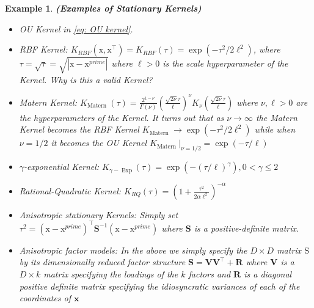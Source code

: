 \documentclass[11pt]{article}
\theoremstyle{plain} %
\newtheorem{example}[theorem]{Example}
\theoremstyle{remark}
\begin{document}
\begin{example} \textbf{(Examples of Stationary Kernels)}
  \begin{itemize}
    \item OU Kernel in \cref{eq: OU kernel}.

    \item RBF Kernel: $K_{R B F}\left(\mathrm{x}, \mathrm{x}^\top\right)=K_{R B
            F}(\tau)=\exp \left(-\tau^{2} / 2 \ell^{2}\right)$, where
          $\tau=\sqrt{\tau}=\sqrt{\left|\mathrm{x}-\mathrm{x}^{prime}\right|}$ where
          $\ell>0$ is the scale hyperparameter of the Kernel. Why is this a valid
          Kernel?

    \item Matern Kernel: $K_{\text {Matern
                }}(\tau)=\frac{2^{1-\nu}}{\Gamma(\nu)}\left(\frac{\sqrt{2 \nu}
              \tau}{\ell}\right)^{\nu} K_{\nu}\left(\frac{\sqrt{2 \nu} \tau}{\ell}\right)$
          where $\nu, \ell>0$ are the hyperparameters of the Kernel. It turns out that
          as $\nu \rightarrow \infty$ the Matern Kernel becomes the RBF Kernel $K_{\text
                {Matern }} \rightarrow \exp \left(-\tau^{2} / 2 \ell^{2}\right)$ while when
          $\nu=1 / 2$ it becomes the OU Kernel $\left.K_{\text {Matern }}\right|_{\nu=1
            / 2}=\exp (-\tau / \ell)$

    \item $\gamma$-exponential Kernel: $K_{\gamma-\operatorname{Exp}}(\tau)=\exp
            \left(-(\tau / \ell)^{\gamma}\right), 0<\gamma \leq 2$

    \item Rational-Quadratic Kernel: $K_{R Q}(\tau)=\left(1+\frac{\tau^{2}}{2
              \alpha \ell^{2}}\right)^{-\alpha}$

    \item Anisotropic stationary Kernels: Simply set
          $\tau^{2}=\left(\mathrm{x}-\mathrm{x}^{prime}\right)^\top
            \mathbf{S}^{-1}\left(\mathrm{x}-\mathrm{x}^{prime}\right)$ where $\mathbf{S}$ is
          a positive-definite matrix.

    \item Anisotropic factor models: In the above we simply specify the $D \times
            D$ matrix $\mathrm{S}$ by its dimensionally reduced factor structure
          $\mathbf{S}=\mathbf{V} \mathbf{V}^\top+\mathbf{R}$ where $\mathbf{V}$ is a $D
            \times k$ matrix specifying the loadings of the $k$ factors and $\mathbf{R}$
          is a diagonal positive definite matrix specifying the idiosyncratic variances
          of each of the coordinates of $\mathbf{x}$
  \end{itemize}
\end{example}
\end{document}
